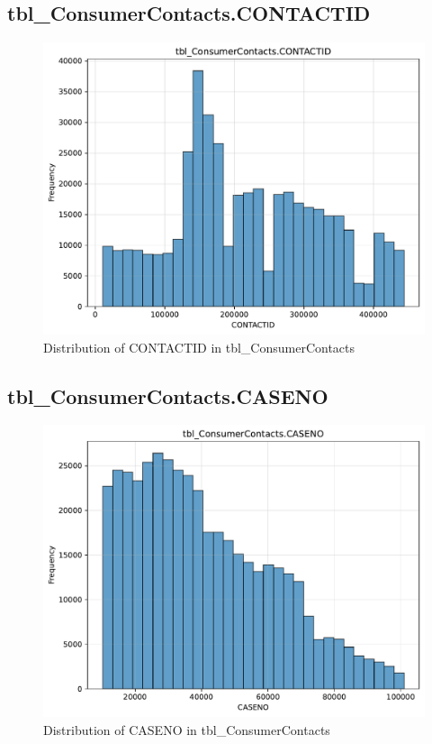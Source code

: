 \subsection{tbl\_ConsumerContacts.CONTACTID}

\begin{figure}[htbp]
\centering
\includegraphics[width=\textwidth]{figures/dbo_tbl_ConsumerContacts_CONTACTID.pdf}
\caption{Distribution of CONTACTID in tbl\_ConsumerContacts}
\end{figure}\newpage

\subsection{tbl\_ConsumerContacts.CASENO}

\begin{figure}[htbp]
\centering
\includegraphics[width=\textwidth]{figures/dbo_tbl_ConsumerContacts_CASENO.pdf}
\caption{Distribution of CASENO in tbl\_ConsumerContacts}
\end{figure}\newpage

